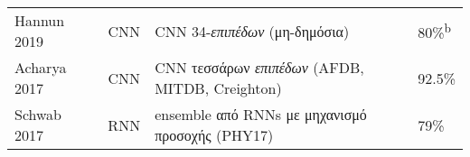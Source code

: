 \begin{sidewaystable}
\begin{tabular}{l c l l}
		Hannun 2019~\cite{hannun2019cardiologist} & CNN             & CNN 34-\textit{επιπέδων} (μη-δημόσια)                                                                 & 80\%\textsuperscript{b}                                                                                                                                                                                                                                                                                                                                                                                                                                                                                                                                                                                                                                                                                                                                                                                                                                                     \\
		Acharya 2017~\cite{acharya2017automateda}       & CNN             & CNN τεσσάρων \textit{επιπέδων} (AFDB, MITDB, Creighton)                                               & 92.5\%                                                                                                                                                                                                                                                                                                                                                                                                                                                                                                                                                                                                                                                                                                                                                                                                                                                                           \\
		Schwab 2017~\cite{schwab2017beat}               & RNN             & ensemble από RNNs με μηχανισμό προσοχής (PHY17)                                                       & 79\%                                                                                                                                                                                                                                                                                                                                                                                                                                                                                                                                                                                                                                                                                                                                                                                                                                                                             \\

\end{tabular}
\end{sidewaystable}
